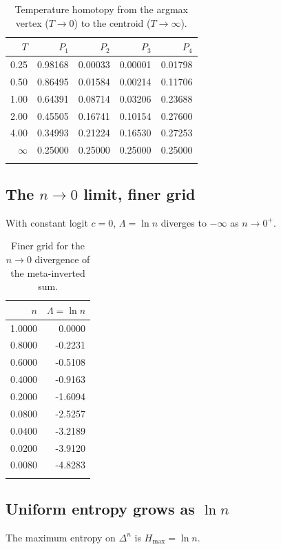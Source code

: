 \documentclass[11pt]{article}
\newcommand{\simplex}[1]{\Delta^{#1}}
\begin{document}
\begin{longtable}{@{}rrrrr@{}}
\toprule
$T$ & $P_1$ & $P_2$ & $P_3$ & $P_4$ \\
\midrule
0.25 & 0.98168 & 0.00033 & 0.00001 & 0.01798 \\
0.50 & 0.86495 & 0.01584 & 0.00214 & 0.11706 \\
1.00 & 0.64391 & 0.08714 & 0.03206 & 0.23688 \\
2.00 & 0.45505 & 0.16741 & 0.10154 & 0.27600 \\
4.00 & 0.34993 & 0.21224 & 0.16530 & 0.27253 \\
$\infty$ & 0.25000 & 0.25000 & 0.25000 & 0.25000 \\
\bottomrule
\caption{Temperature homotopy from the argmax vertex ($T\to 0$) to the centroid
($T\to\infty$).}
\label{tab:comp-temp}
\end{longtable}

\subsection{The $n\to 0$ limit, finer grid}
\label{sec:comp-lim0}

With constant logit $c=0$, $\Lambda=\ln n$ diverges to $-\infty$ as $n\to 0^+$.

\begin{longtable}{@{}rr@{}}
\toprule
$n$ & $\Lambda=\ln n$ \\
\midrule
1.0000 & 0.0000 \\
0.8000 & -0.2231 \\
0.6000 & -0.5108 \\
0.4000 & -0.9163 \\
0.2000 & -1.6094 \\
0.0800 & -2.5257 \\
0.0400 & -3.2189 \\
0.0200 & -3.9120 \\
0.0080 & -4.8283 \\
\bottomrule
\caption{Finer grid for the $n\to 0$ divergence of the meta-inverted sum.}
\label{tab:comp-lim0}
\end{longtable}

\subsection{Uniform entropy grows as $\ln n$}
\label{sec:comp-uniform}

The maximum entropy on $\simplex{n}$ is $H_{\max}=\ln n$.
\end{document}

